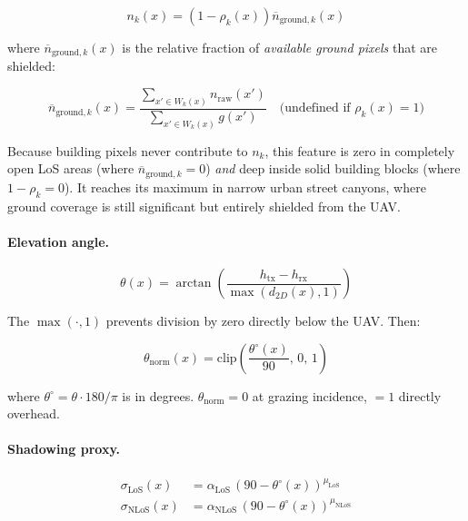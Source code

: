 \documentclass[11pt,a4paper]{article}
\begin{document}
\begin{equation}
n_k(x)
=
\left(1 - \rho_k(x)\right)
\overline{n}_{\mathrm{ground}, k}(x)
\label{eq:n_k_interp}
\end{equation}

where $\overline{n}_{\mathrm{ground}, k}(x)$ is the relative fraction of
\emph{available ground pixels} that are shielded:

\begin{equation}
\overline{n}_{\mathrm{ground}, k}(x)
=
\frac{\displaystyle\sum_{x'\in W_k(x)} n_{\mathrm{raw}}(x')}
     {\displaystyle\sum_{x'\in W_k(x)} g(x')}
\quad\text{(undefined if }\rho_k(x)=1\text{)}
\end{equation}

Because building pixels never contribute to $n_k$, this feature is zero in
completely open LoS areas (where $\overline{n}_{\mathrm{ground}, k} = 0$)
\emph{and} deep inside solid building blocks (where $1 - \rho_k = 0$). It
reaches its maximum in narrow urban street canyons, where ground coverage is
still significant but entirely shielded from the UAV.

\paragraph{Elevation angle.}

\begin{equation}
\theta(x)=\arctan\left(\frac{h_{\mathrm{tx}}-h_{\mathrm{rx}}}{\max(d_{2D}(x),1)}\right)
\label{eq:theta}
\end{equation}

The $\max(\cdot, 1)$ prevents division by zero directly below the UAV.
Then:

\begin{equation}
\theta_{\mathrm{norm}}(x)=
\mathrm{clip}\left(\frac{\theta^\circ(x)}{90},\,0,\,1\right)
\label{eq:theta_norm}
\end{equation}

where $\theta^\circ = \theta \cdot 180/\pi$ is in degrees. $\theta_{\mathrm{norm}}
= 0$ at grazing incidence, $= 1$ directly overhead.

\paragraph{Shadowing proxy.}

\begin{align}
\sigma_{\mathrm{LoS}}(x) &= \alpha_{\mathrm{LoS}}\,(90-\theta^\circ(x))^{\mu_{\mathrm{LoS}}}
\label{eq:sigma_los}\\
\sigma_{\mathrm{NLoS}}(x) &= \alpha_{\mathrm{NLoS}}\,(90-\theta^\circ(x))^{\mu_{\mathrm{NLoS}}}
\label{eq:sigma_nlos}
\end{align}
\end{document}
